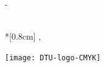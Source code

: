 \begin{adjustwidth*}{\unitlength}{-\unitlength}
\begin{adjustwidth}{-0.5cm}{-0.5cm}
        \noindent
        \parbox[b]{0.5\linewidth}{%
        	\noindent
            \Large 
            \thesisauthor{}\\*[0.8cm]
            \large
            \thesislocation{}, \the\year
        }
        \hfill\texttt{[image: DTU-logo-CMYK]}
    \end{adjustwidth}
\end{adjustwidth*}
\normalfont
\normalsize